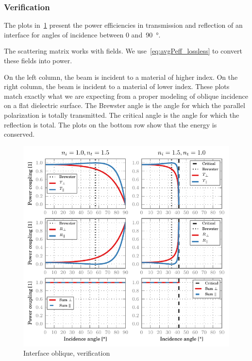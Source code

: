 \subsubsection{Verification}
The plots in~\cref{fig:interface_oblique_verification} present the power efficiencies in transmission and reflection of an interface for angles of incidence between \num{0} and~\SI{90}{\degree}.

The scattering matrix works with fields.
We use~\vref{eq:avgPeff_lossless} to convert these fields into power.

On the left column, the beam is incident to a material of higher index.
On the right column, the beam is incident to a material of lower index.
These plots match exactly what we are expecting from a proper modeling of oblique incidence on a flat dielectric surface.
The Brewster angle is the angle for which the parallel polarization is totally transmitted.
The critical angle is the angle for which the reflection is total.
The plots on the bottom row show that the energy is conserved.
\begin{figure}[hbtp]
    \centering
    \includegraphics{interface_oblique_verification}
    \caption{Interface oblique, verification}
    \label{fig:interface_oblique_verification}
\end{figure}




